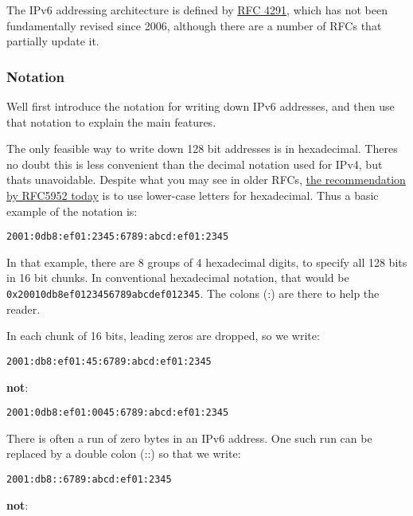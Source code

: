 \documentclass[
]{article}
\begin{document}
The IPv6 addressing architecture is defined by
\href{http://www.rfc-editor.org/info/rfc4291}{RFC 4291}, which has not
been fundamentally revised since 2006, although there are a number of
RFCs that partially update it.

\subsubsection{Notation}\label{notation}

We\textquotesingle ll first introduce the notation for writing down IPv6
addresses, and then use that notation to explain the main features.

The only feasible way to write down 128 bit addresses is in hexadecimal.
There\textquotesingle s no doubt this is less convenient than the
decimal notation used for IPv4, but that\textquotesingle s unavoidable.
Despite what you may see in older RFCs,
\href{https://www.rfc-editor.org/info/rfc5952}{the recommendation by
RFC5952 today} is to use lower-case letters for hexadecimal. Thus a
basic example of the notation is:

\begin{verbatim}
2001:0db8:ef01:2345:6789:abcd:ef01:2345
\end{verbatim}

In that example, there are 8 groups of 4 hexadecimal digits, to specify
all 128 bits in 16 bit chunks. In conventional hexadecimal notation,
that would be \texttt{0x20010db8ef0123456789abcdef012345}. The colons
(\textquotesingle:\textquotesingle) are there to help the reader.

In each chunk of 16 bits, leading zeros are dropped, so we write:

\begin{verbatim}
2001:db8:ef01:45:6789:abcd:ef01:2345
\end{verbatim}

\textbf{not}:

\begin{verbatim}
2001:0db8:ef01:0045:6789:abcd:ef01:2345
\end{verbatim}

There is often a run of zero bytes in an IPv6 address. One such run can
be replaced by a double colon (\textquotesingle::\textquotesingle) so
that we write:

\begin{verbatim}
2001:db8::6789:abcd:ef01:2345
\end{verbatim}

\textbf{not}:
\end{document}
